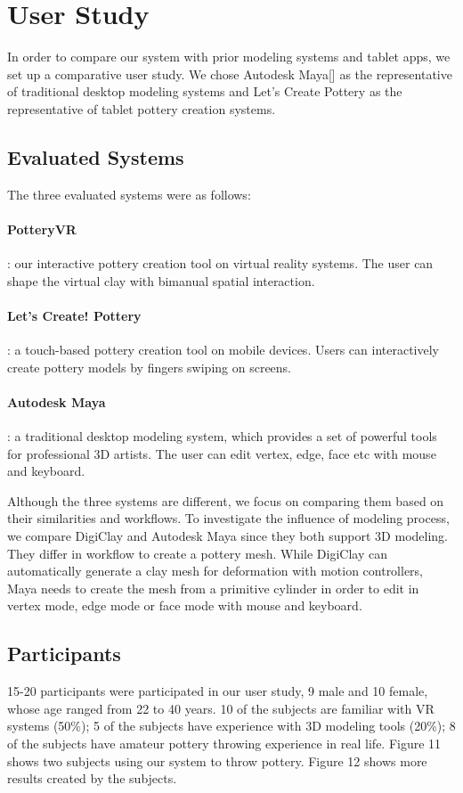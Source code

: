 \section{User Study}
\label{sec:6}
In order to compare our system with prior modeling systems and tablet apps, we set up a comparative user study. We chose Autodesk Maya[] as the representative of traditional desktop modeling systems and Let's Create Pottery as the representative of tablet pottery creation systems.

\subsection{Evaluated Systems}
\label{sec:6.1}
The three evaluated systems were as follows:

\paragraph{PotteryVR}: our interactive pottery creation tool on virtual reality systems. The user can shape the virtual clay with bimanual spatial interaction.
\paragraph{Let’s Create! Pottery}: a touch-based pottery creation tool on mobile devices. Users can interactively create pottery models by fingers swiping on screens.\cite{website:letspottery}
\paragraph{Autodesk Maya}: a traditional desktop modeling system, which provides a set of powerful tools for professional 3D artists. The user can edit vertex, edge, face etc with mouse and keyboard.

Although the three systems are different, we focus on comparing them based on their similarities and workflows.
To investigate the influence of modeling process, we compare DigiClay and Autodesk Maya since they both support 3D modeling. They differ in workflow to create a pottery mesh. While DigiClay can automatically generate a clay mesh for deformation with motion controllers, Maya needs to create the mesh from a primitive cylinder in order to edit in vertex mode, edge mode or face mode with mouse and keyboard. 

\subsection{Participants}
\label{sec:6.2}
15-20 participants were participated in our user study, 9 male and 10 female, whose age ranged from 22 to 40 years. 10 of the subjects are familiar with VR systems (50\%); 5 of the subjects have experience with 3D modeling tools (20\%); 8 of the subjects have amateur pottery throwing experience in real life.
Figure 11 shows two subjects using our system to throw pottery. Figure 12 shows more results created by the subjects.

